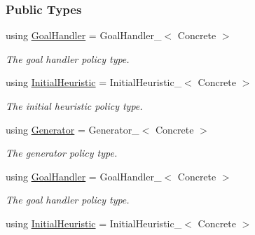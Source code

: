 \subsubsection*{Public Types}
\begin{DoxyCompactItemize}
\item 
using \hyperlink{structalgorithm_1_1Algorithm_af9111b0a505a193a2c4878b710b8ea65}{Goal\+Handler} = Goal\+Handler\+\_\+$<$ Concrete $>$\hypertarget{structalgorithm_1_1Algorithm_af9111b0a505a193a2c4878b710b8ea65}{}\label{structalgorithm_1_1Algorithm_af9111b0a505a193a2c4878b710b8ea65}

\begin{DoxyCompactList}\small\item\em The goal handler policy type. \end{DoxyCompactList}\item 
using \hyperlink{structalgorithm_1_1Algorithm_aa0c111908e844c0ff5cfe78f778bba52}{Initial\+Heuristic} = Initial\+Heuristic\+\_\+$<$ Concrete $>$\hypertarget{structalgorithm_1_1Algorithm_aa0c111908e844c0ff5cfe78f778bba52}{}\label{structalgorithm_1_1Algorithm_aa0c111908e844c0ff5cfe78f778bba52}

\begin{DoxyCompactList}\small\item\em The initial heuristic policy type. \end{DoxyCompactList}\item 
using \hyperlink{structalgorithm_1_1Algorithm_a4b5d0c94b49b586bd31af92ed6ec94ad}{Generator} = Generator\+\_\+$<$ Concrete $>$\hypertarget{structalgorithm_1_1Algorithm_a4b5d0c94b49b586bd31af92ed6ec94ad}{}\label{structalgorithm_1_1Algorithm_a4b5d0c94b49b586bd31af92ed6ec94ad}

\begin{DoxyCompactList}\small\item\em The generator policy type. \end{DoxyCompactList}\item 
using \hyperlink{structalgorithm_1_1Algorithm_af9111b0a505a193a2c4878b710b8ea65}{Goal\+Handler} = Goal\+Handler\+\_\+$<$ Concrete $>$\hypertarget{structalgorithm_1_1Algorithm_af9111b0a505a193a2c4878b710b8ea65}{}\label{structalgorithm_1_1Algorithm_af9111b0a505a193a2c4878b710b8ea65}

\begin{DoxyCompactList}\small\item\em The goal handler policy type. \end{DoxyCompactList}\item 
using \hyperlink{structalgorithm_1_1Algorithm_aa0c111908e844c0ff5cfe78f778bba52}{Initial\+Heuristic} = Initial\+Heuristic\+\_\+$<$ Concrete $>$\hypertarget{structalgorithm_1_1Algorithm_aa0c111908e844c0ff5cfe78f778bba52}{}\label{structalgorithm_1_1Algorithm_aa0c111908e844c0ff5cfe78f778bba52}


\end{DoxyCompactItemize}
